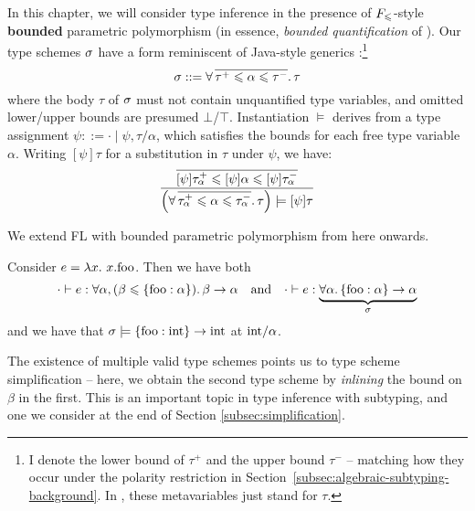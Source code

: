 In this chapter, we will consider type inference in the presence of $F_\leqslant$-style \textbf{bounded} parametric polymorphism (in essence, \emph{bounded quantification} of \textcite{bounded-quantification}). Our type schemes $\sigma$ have a form reminiscent of Java-style generics \cite{generic-java, simple-sub}:\footnote{I denote the lower bound of $\tau^+$ and the upper bound $\tau^-$ -- matching how they occur under the polarity restriction in Section~\ref{subsec:algebraic-subtyping-background}. In \inference{}, these metavariables just stand for $\tau$.}
$$ \sigma ::= \forall \, \overline{\tau^+ \leqslant \alpha \leqslant \tau^-} \ldotp \tau $$
where the body $\tau$ of $\sigma$ must not contain unquantified type variables, and omitted lower/upper bounds are presumed $\bot$/$\top$. 
Instantiation $\models$ derives from a type assignment $\psi ::= \cdot \mid \psi, \tau/\alpha$, which satisfies the bounds for each free type variable $\alpha$. Writing $[\psi]\tau$ for a substitution in $\tau$ under $\psi$, we have:
$$ \dfrac{\overline{[\psi]\tau_\alpha^+ \sub \substx{\psi} \alpha \sub [\psi]\tau_\alpha^-}}{\left( \forall\, \overline{\tau_\alpha^+ \sub \alpha \sub \tau_\alpha^-} \ldotp \tau \right) \models \substx{\psi}{\tau}} $$

\begin{example}
    We extend FL with bounded parametric polymorphism from here onwards. 

    Consider $e = \lambda {x} \ldotp\, {x}{.}{\mathrm{foo}}$. Then we have both 
    $$ \cdot \vdash e : \forall \alpha, (\beta \sub \flrec{\mathrm{foo} : \alpha}) \ldotp \beta \to \alpha  \quad \text{and} \quad \cdot \vdash e : \underbrace{\forall \alpha \ldotp \flrec{\mathrm{foo} : \alpha} \to \alpha}_\sigma $$
    and we have that $\sigma \models \flrec{\mathrm{foo} : \sint} \to \sint$ at $\mathrm{int}/\alpha$.
    
    The existence of multiple valid type schemes points us to type scheme simplification -- here, we obtain the second type scheme by \emph{inlining} the bound on $\beta$ in the first. This is an important topic in type inference with subtyping, and one we consider at the end of Section \ref{subsec:simplification}.
\end{example}

